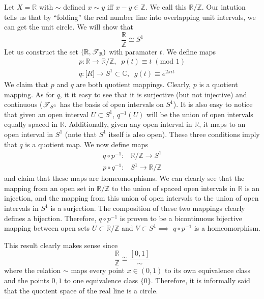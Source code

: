     \begin{example}
      Let $X = \mathbb{R}$ with $\sim$ defined $x \sim y$ iff $x - y \in \mathbb{Z}$. We call this $\mathbb{R}/\mathbb{Z}$. Our intution tells us that by ``folding'' the real number line into overlapping unit intervals, we can get the unit circle. We will show that
      \begin{equation}
        \frac{\mathbb{R}}{\mathbb{Z}} \cong S^1
      \end{equation}
      Let us construct the set $(\mathbb{R}, \T_{\mathbb{R}})$ with paramater $t$. We define maps
      \begin{align*}
        p: \mathbb{R} \rightarrow \mathbb{R} / \mathbb{Z}, \;\; p(t) \equiv t \; (\text{mod } 1) \\
        q: \mathbb[R] \rightarrow S^1 \subset \mathbb{C}, \;\; g(t) \equiv e^{2 \pi i t} 
      \end{align*}
      We claim that $p$ and $q$ are both quotient mappings. Clearly, $p$ is a quotient mapping. As for $q$, it it easy to see that it is surjective (but not injective) and continuous ($\T_{S^1}$ has the basis of open intervals on $S^1$). It is also easy to notice that given an open interval $U \subset S^1$, $q^{-1}(U)$ will be the union of open intervals equally spaced in $\mathbb{R}$. Additionally, given any open interval in $\mathbb{R}$, it maps to an open interval in $S^1$ (note that $S^1$ itself is also open). These three conditions imply that $q$ is a quotient map. We now define maps 
      \begin{align}
        q \circ p^{-1}: & \mathbb{R} / \mathbb{Z} \rightarrow S^1 \\
        p \circ q^{-1}: & S^1 \rightarrow \mathbb{R} / \mathbb{Z}
      \end{align}
      and claim that these maps are homeomorphisms. We can clearly see that the mapping from an open set in $\mathbb{R} / \mathbb{Z}$ to the union of spaced open intervals in $\mathbb{R}$ is an injection, and the mapping from this union of open intervals to the union of open intervals in $S^1$ is a surjection. The composition of these two mappings clearly defines a bijection. Therefore, $q \circ p^{-1}$ is proven to be a bicontinuous bijective mapping between open sets $U \subset \mathbb{R} / \mathbb{Z}$ and $V \subset S^1 \implies$ $q \circ p^{-1}$ is a homeomorphism. 

      This result clearly makes sense since 
      \begin{equation}
        \frac{\mathbb{R}}{\mathbb{Z}} \cong \frac{[0,1]}{\sim}
      \end{equation}
      where the relation $\sim$ maps every point $x \in (0,1)$ to its own equivalence class and the points $0, 1$ to one equivalence class $\{0\}$. Therefore, it is informally said that the quotient space of the real line is a circle. 


\end{example}
